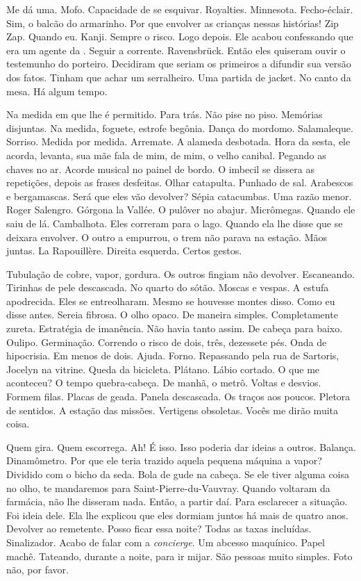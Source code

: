 Me dá uma. Mofo. Capacidade de se esquivar. Royalties. Minnesota.
Fecho-éclair. Sim, o balcão do armarinho. Por que envolver as crianças
nessas histórias! Zip Zap. Quando eu. Kanji. Sempre o risco. Logo
depois. Ele acabou confessando que era um agente da . Seguir a
corrente. Ravensbrück. Então eles quiseram ouvir o testemunho do
porteiro. Decidiram que seriam os primeiros a difundir sua versão dos
fatos. Tinham que achar um serralheiro. Uma partida de jacket. No canto
da mesa. Há algum tempo.

Na medida em que lhe é permitido. Para trás. Não pise no piso. Memórias
disjuntas. Na medida, foguete, estrofe begônia. Dança do mordomo.
Salamaleque. Sorriso. Medida por medida. Arremate. A alameda desbotada.
Hora da sesta, ele acorda, levanta, sua mãe fala de mim, de mim, o velho
canibal. Pegando as chaves no ar. Acorde musical no painel de bordo. O
imbecil se dissera as repetições, depois as frases desfeitas. Olhar
catapulta. Punhado de sal. Arabescos e bergamascas. Será que eles vão
devolver? Sépia catacumbas. Uma razão menor. Roger Salengro. Górgona la
Vallée. O pulôver no abajur. Micrômegas. Quando ele saiu de lá.
Cambalhota. Eles correram para o lago. Quando ela lhe disse que se
deixara envolver. O outro a empurrou, o trem não parava na estação. Mãos
juntas. La Rapouillère. Direita esquerda. Certos gestos.

Tubulação de cobre, vapor, gordura. Os outros fingiam não devolver.
Escaneando. Tirinhas de pele descascada. No quarto do sótão. Moscas e
vespas. A estufa apodrecida. Eles se entreolharam. Mesmo se houvesse
montes disso. Como eu disse antes. Sereia fibrosa. O olho opaco. De
maneira simples. Completamente zureta. Estratégia de imanência. Não
havia tanto assim. De cabeça para baixo. Oulipo. Germinação. Correndo o
risco de dois, três, dezessete pés. Onda de hipocrisia. Em menos de
dois. Ajuda. Forno. Repassando pela rua de Sartoris, Jocelyn na vitrine.
Queda da bicicleta. Plátano. Lábio cortado. O que me aconteceu? O tempo
quebra-cabeça. De manhã, o metrô. Voltas e desvios. Formem filas. Placas
de geada. Panela descascada. Os traços aos poucos. Pletora de sentidos.
A estação das missões. Vertigens obsoletas. Vocês me dirão muita coisa.

Quem gira. Quem escorrega. Ah! É isso. Isso poderia dar ideias a outros.
Balança. Dinamômetro. Por que ele teria trazido aquela pequena máquina a
vapor? Dividido com o bicho da seda. Bola de gude na cabeça. Se ele
tiver alguma coisa no olho, te mandaremos para Saint-Pierre-du-Vauvray.
Quando voltaram da farmácia, não lhe disseram nada. Então, a partir daí.
Para esclarecer a situação. Foi ideia dele. Ela lhe explicou que eles
dormiam juntos há mais de quatro anos. Devolver ao remetente. Posso
ficar essa noite? Todas as taxas incluídas. Sinalizador. Acabo de falar
com a \emph{concierge}. Um abcesso maquínico. Papel machê. Tateando,
durante a noite, para ir mijar. São pessoas muito simples. Foto não, por
favor.

